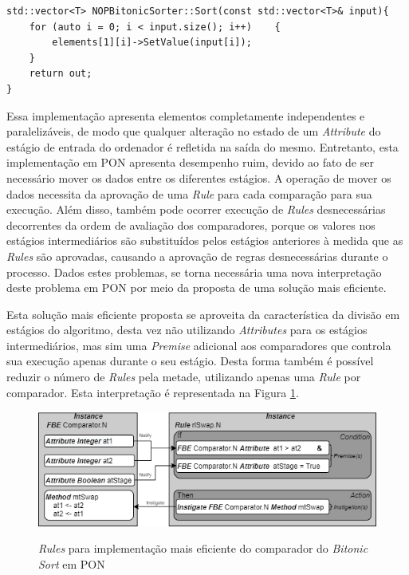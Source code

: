 \begin{lstlisting}[caption = {Trecho de código da estrutura NOPBitonicSorter},
  source = {Autoria própria}, float=htb,
  label = {cod:sort_function}]
std::vector<T> NOPBitonicSorter::Sort(const std::vector<T>& input){
    for (auto i = 0; i < input.size(); i++)    {
        elements[1][i]->SetValue(input[i]);
    }
    return out;
}
\end{lstlisting}

Essa implementação apresenta elementos completamente independentes e
paralelizáveis, de modo que qualquer alteração no estado de um
\textit{Attribute} do estágio de entrada do ordenador é refletida na saída do
mesmo. Entretanto, esta implementação em PON apresenta desempenho ruim, devido
ao fato de ser necessário mover os dados entre os diferentes estágios. A
operação de mover os dados necessita da aprovação de uma \textit{Rule} para cada
comparação para sua execução. Além disso, também pode ocorrer execução de
\textit{Rules} desnecessárias decorrentes da ordem de avaliação dos
comparadores, porque os valores nos estágios intermediários são substituídos
pelos estágios anteriores à medida que as \textit{Rules} são aprovadas,
causando a aprovação de regras desnecessárias durante o processo. Dados estes
problemas, se torna necessária uma nova interpretação deste problema em PON por
meio da proposta de uma solução mais eficiente.

Esta solução mais eficiente proposta se aproveita da característica da divisão
em estágios do algoritmo, desta vez não utilizando \textit{Attributes} para os
estágios intermediários, mas sim uma \textit{Premise} adicional aos comparadores
que controla sua execução apenas durante o seu estágio. Desta forma também é
possível reduzir o número de \textit{Rules} pela metade, utilizando apenas uma
\textit{Rule} por comparador. Esta interpretação é representada na Figura
\ref{fig:rule_bitonic_old}.

\begin{figure}[!htb]
\centering
\caption{\textit{Rules} para implementação mais eficiente do comparador do
\textit{Bitonic Sort} em PON}
\includegraphics[width=0.95 \textwidth]{../figures/nop_bitonic_old.png}
\smallskip
{}
\label{fig:rule_bitonic_old}
\end{figure}

